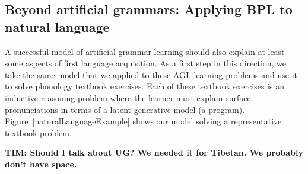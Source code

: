 \documentclass{article}
\begin{document}
\subsection{Beyond artificial grammars: Applying BPL to natural language}

A successful model of
artificial grammar learning should also explain at least some aspects of first language acquisition.
As a first step in this direction,
we take the same model that we applied to
these AGL learning problems and use it to solve phonology textbook exercises.
Each of these textbook exercises is an inductive reasoning
problem where the learner must
explain surface pronunciations
in terms of a latent generative model (a program).
Figure~\ref{naturalLanguageExample}
shows our model solving a
representative textbook problem.

\textbf{TIM: Should I talk about UG? We needed it for Tibetan. We probably don't have space.}
\end{document}
